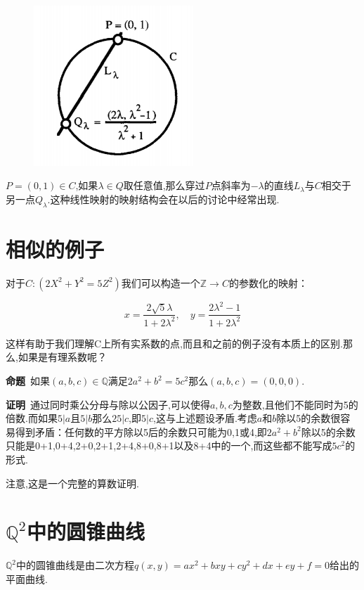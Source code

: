 \documentclass[UTF8]{book}
\begin{document}
	

		\begin{figure}[H]
		  \centering
		  \includegraphics[width=6cm]{10.jpg}\\
		\end{figure}\par


		$ P=(0,1)\in C $,如果$\lambda \in Q$取任意值,那么穿过$ P $点斜率为$-\lambda$的直线$L_{\lambda}$与$ C $相交于另一点$Q_{\lambda}$.这种线性映射的映射结构会在以后的讨论中经常出现.
	
	\section{相似的例子}
		对于$ C:(2 X^{2} + Y^{2} =5 Z^{2}) $我们可以构造一个$ \mathbb{Z} \to C $的参数化的映射：
		
		\begin{equation*}
		x=\frac{2 \sqrt{5} \lambda}{1+2 \lambda^{2}}, \quad y=\frac{2 \lambda^{2}-1}{1+2 \lambda^{2}}
		\end{equation*}
		
		
		
		这样有助于我们理解C上所有实系数的点,而且和之前的例子没有本质上的区别.那么,如果是有理系数呢？
	
	
		\textbf{命题}\ 如果$ (a,b,c) \in \mathbb{Q} $满足$ 2a^{2}+b^{2}=5c^{2} $那么$ (a,b,c)=(0,0,0) $.
	
	
		\textbf{证明}\ 通过同时乘公分母与除以公因子,可以使得$ a,b,c $为整数,且他们不能同时为5的倍数.而如果$5\lvert a$且$ 5\lvert b $那么$ 25 \lvert c $,即$ 5 \lvert c $,这与上述题设矛盾.考虑$ a $和$ b $除以5的余数很容易得到矛盾：任何数的平方除以5后的余数只可能为0,1或4,即$2 a^{2}+b^{2}$除以5的余数只能是0+1,0+4,2+0,2+1,2+4,8+0,8+1以及8+4中的一个,而这些都不能写成$5 c^{2}$的形式.
	
	
		注意,这是一个完整的算数证明.
	\section{$\mathbb{Q}^{2}$中的圆锥曲线}
		$\mathbb{Q}^{2}$中的圆锥曲线是由二次方程$q(x,y)=ax^{2}+bxy+cy^{2}+dx+ey+f=0$给出的平面曲线.
	
\end{document}
